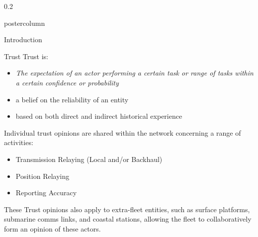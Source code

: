 \documentclass[final,hyperref={pdfpagelabels=false}]{beamer}
\def\colwidth{0.2\linewidth}
\begin{document}
\begin{frame}[fragile]
\begin{columns}[T]
\begin{column}{\colwidth}
\begin{beamercolorbox}[center,wd=\textwidth]{postercolumn}
\begin{minipage}[T]{.98\textwidth}
{\begin{block}{Introduction}
          \end{block}
          \begin{block}{Trust}
            Trust is:
            \begin{itemize}
              \item \emph{The expectation of an actor performing a certain task or range of tasks within a certain confidence or probability}
              \item a belief on the reliability of an entity
              \item based on both direct and indirect historical experience
            \end{itemize}
            \vspace{0.3\baselineskip}

            Individual trust opinions are shared within the network concerning a range of activities:
            \begin{itemize}
              \item Transmission Relaying (Local and/or Backhaul)
              \item Position Relaying
              \item Reporting Accuracy
            \end{itemize}
            \vspace{0.3\baselineskip}

            These Trust opinions also apply to extra-fleet entities, such as surface platforms, submarine comms links, and coastal stations, allowing the fleet to collaboratively form an opinion of these actors.

          \end{block}
          }
        \end{minipage}
      \end{beamercolorbox}
    \end{column}


\end{columns}
\end{frame}
\end{document}
